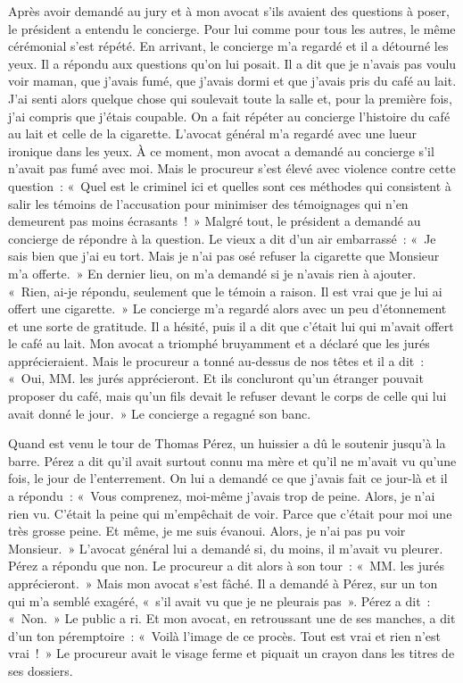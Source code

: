 \documentclass[french,twoside]{book} %
\begin{document}
Après avoir demandé au jury et à mon avocat s’ils avaient des questions à poser, le président a entendu le concierge. Pour lui comme pour tous les autres, le même cérémonial s’est répété. En arrivant, le concierge m’a regardé et il a détourné les yeux. Il a répondu aux questions qu’on lui posait. Il a dit que je n’avais pas voulu voir maman, que j’avais fumé, que j’avais dormi et que j’avais pris du café au lait. J'ai senti alors quelque chose qui soulevait toute la salle et, pour la première fois, j’ai compris que j’étais coupable. On a fait répéter au concierge l’histoire du café au lait et celle de la cigarette. L'avocat général m’a regardé avec une lueur ironique dans les yeux. À ce moment, mon avocat a demandé au concierge s’il n’avait pas fumé avec moi. Mais le procureur s’est élevé avec violence contre cette question : « Quel est le criminel ici et quelles sont ces méthodes qui consistent à salir les témoins de l’accusation pour minimiser des témoignages qui n’en demeurent pas moins écrasants ! » Malgré tout, le président a demandé au concierge de répondre à la question. Le vieux a dit d’un air embarrassé : « Je sais bien que j’ai eu tort. Mais je n’ai pas osé refuser la cigarette que Monsieur m’a offerte. » En dernier lieu, on m’a demandé si je n’avais rien à ajouter. « Rien, ai-je répondu, seulement que le témoin a raison. Il est vrai que je lui ai offert une cigarette. » Le concierge m’a regardé alors avec un peu d’étonnement et une sorte de gratitude. Il a hésité, puis il a dit que c’était lui qui m’avait offert le café au lait. Mon avocat a triomphé bruyamment et a déclaré que les jurés apprécieraient. Mais le procureur a tonné au-dessus de nos têtes et il a dit : « Oui, MM. les jurés apprécieront. Et ils concluront qu’un étranger pouvait proposer du café, mais qu’un fils devait le refuser devant le corps de celle qui lui avait donné le jour. » Le concierge a regagné son banc.\par
Quand est venu le tour de Thomas Pérez, un huissier a dû le soutenir jusqu’à la barre. Pérez a dit qu’il avait surtout connu ma mère et qu’il ne m’avait vu qu’une fois, le jour de l’enterrement. On lui a demandé ce que j’avais fait ce jour-là et il a répondu : « Vous comprenez, moi-même j’avais trop de peine. Alors, je n’ai rien vu. C'était la peine qui m’empêchait de voir. Parce que c’était pour moi une très grosse peine. Et même, je me suis évanoui. Alors, je n’ai pas pu voir Monsieur. » L'avocat général lui a demandé si, du moins, il m’avait vu pleurer. Pérez a répondu que non. Le procureur a dit alors à son tour : « MM. les jurés apprécieront. » Mais mon avocat s’est fâché. Il a demandé à Pérez, sur un ton qui m’a semblé exagéré, « s’il avait vu que je ne pleurais pas ». Pérez a dit : « Non. » Le public a ri. Et mon avocat, en retroussant une de ses manches, a dit d’un ton péremptoire : « Voilà l’image de ce procès. Tout est vrai et rien n’est vrai ! » Le procureur avait le visage ferme et piquait un crayon dans les titres de ses dossiers.\par
\end{document}

